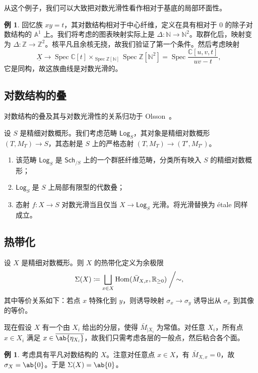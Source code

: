 \documentclass{amsart}
\theoremstyle{definition}
\newtheorem{exm}[thm]{例}
\theoremstyle{remark}
\theoremstyle{plain}
\theoremstyle{definition}
\theoremstyle{remark}
\newcommand{\A}{\mathbb{A}}
\newcommand{\N}{\mathbb{N}}
\newcommand{\R}{\mathbb{R}}
\newcommand{\C}{\mathbb{C}}
\newcommand{\Z}{\mathbb{Z}}
\newcommand{\ms}[1]{\mathsf{#1}}
\newcommand{\ol}[1]{\overline{#1}}
\newcommand{\ul}[1]{\underline{#1}}
\newcommand{\1}{\mathbf{1}}
\newcommand{\2}{\mathbf{2}}
\newcommand{\3}{\mathbf{3}}
\DeclareMathOperator{\Hom}{Hom}
\DeclareMathOperator{\Spec}{Spec}
\begin{document}
从这个例子，我们可以大致把对数光滑性看作相对于基底的局部环面性。

\begin{exm}
    回忆族 \(xy = t\)，其对数结构相对于中心纤维，定义在具有相对于 \(0\) 的除子对数结构的 \(\A^1\) 上。我们将考虑的图表映射实际上是 \(\Delta \colon \N \to \N^2\)。取群化后，映射变为 \(\Delta \colon \Z \to \Z^2\)。核平凡且余核无挠，故我们验证了第一个条件。然后考虑映射
    \[ \ul{X} \to \Spec \C[t] \times_{\Spec \Z[\N]} \Spec \Z[\N^2] = \Spec \frac{\C[u,v,t]}{uv-t}, \]
    它是同构，故这族曲线是对数光滑的。
\end{exm}

\subsection{对数结构的叠}%
\label{sub:Stack of log structures}

对数结构的叠及其与对数光滑性的关系归功于 Olsson~\cite{Olsson2003}。

设 \(S\) 是精细对数概形。我们考虑范畴 \(\ms{Log}_S\)，其对象是精细对数概形 \((T, M_T) \to S\)，其态射是 \(S\) 上的严格态射 \((T, M_T) \to (T', M_{T'})\)。
\begin{enumerate}
    \item 该范畴 \(\ms{Log}_S\) 是 \(\ms{Sch}_{/S}\) 上的一个群胚纤维范畴，分类所有映入 \(S\) 的精细对数概形；
    \item \(\ms{Log}_S\) 是 \(S\) 上局部有限型的代数叠；
    \item 态射 \(f \colon X \to S\) 对数光滑当且仅当 \(X \to \ms{Log}_S\) 光滑。将光滑替换为 \'etale 同样成立。
\end{enumerate}

\subsection{热带化}%
\label{sub:Tropicalization}

设 \(X\) 是精细对数概形。则 \(X\) 的热带化定义为余极限
\[\Sigma(X) \coloneqq \bigsqcup_{x \in X} \Hom(\bar{M}_{X,x}, \R_{\geq 0}) \biggm/ \sim, \]
其中等价关系如下：若点 \(x\) 特殊化到 \(y\)，则诱导映射 \(\sigma_x \to \sigma_y\) 诱导出从 \(\sigma_x\) 到其像的等价。

现在假设 \(X\) 有一个由 \(X_i\) 给出的分层，使得 \(\bar{M}_{|X_i}\) 为常值。对任意 \(X_i\)，所有点 \(x \in X_i\) 满足 \(x \in \ol{\ab\{\eta_{X_i}\}}\)，故我们只需考虑各层的一般点，然后粘合各个面。

\begin{exm}
    考虑具有平凡对数结构的 \(X\)。注意对任意点 \(x \in X\)，有 \(\bar{M}_{X,x} = 0\)，故 \(\sigma_X = \ab\{0\}\)。于是 \(\Sigma(X) = \ab\{0\}\)。
\end{exm}
\end{document}
